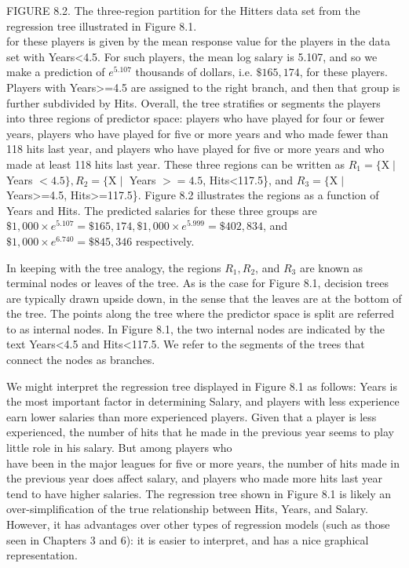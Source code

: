 \documentclass[10pt]{article}
\begin{document}
FIGURE 8.2. The three-region partition for the Hitters data set from the regression tree illustrated in Figure 8.1.\\
for these players is given by the mean response value for the players in the data set with Years<4.5. For such players, the mean log salary is 5.107, and so we make a prediction of $e^{5.107}$ thousands of dollars, i.e. $\$ 165,174$, for these players. Players with Years>=4.5 are assigned to the right branch, and then that group is further subdivided by Hits. Overall, the tree stratifies or segments the players into three regions of predictor space: players who have played for four or fewer years, players who have played for five or more years and who made fewer than 118 hits last year, and players who have played for five or more years and who made at least 118 hits last year. These three regions can be written as $R_{1}=\{\mathrm{X} \mid$ Years $<4.5\}, R_{2}=\{\mathrm{X} \mid$ Years $>=4.5$, Hits<117.5\}, and $R_{3}=\{\mathrm{X} \mid$ Years>=4.5, Hits>=117.5\}. Figure 8.2 illustrates the regions as a function of Years and Hits. The predicted salaries for these three groups are $\$ 1,000 \times e^{5.107}=\$ 165,174, \$ 1,000 \times e^{5.999}=\$ 402,834$, and $\$ 1,000 \times e^{6.740}=\$ 845,346$ respectively.

In keeping with the tree analogy, the regions $R_{1}, R_{2}$, and $R_{3}$ are known as terminal nodes or leaves of the tree. As is the case for Figure 8.1, decision trees are typically drawn upside down, in the sense that the leaves are at the bottom of the tree. The points along the tree where the predictor space is split are referred to as internal nodes. In Figure 8.1, the two internal nodes are indicated by the text Years<4.5 and Hits<117.5. We refer to the segments of the trees that connect the nodes as branches.

We might interpret the regression tree displayed in Figure 8.1 as follows: Years is the most important factor in determining Salary, and players with less experience earn lower salaries than more experienced players. Given that a player is less experienced, the number of hits that he made in the previous year seems to play little role in his salary. But among players who\\
have been in the major leagues for five or more years, the number of hits made in the previous year does affect salary, and players who made more hits last year tend to have higher salaries. The regression tree shown in Figure 8.1 is likely an over-simplification of the true relationship between Hits, Years, and Salary. However, it has advantages over other types of regression models (such as those seen in Chapters 3 and 6): it is easier to interpret, and has a nice graphical representation.
\end{document}
